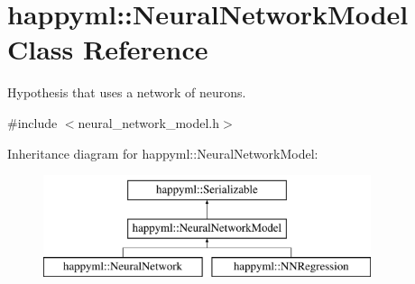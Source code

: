 \hypertarget{classhappyml_1_1NeuralNetworkModel}{}\section{happyml\+:\+:Neural\+Network\+Model Class Reference}
\label{classhappyml_1_1NeuralNetworkModel}


Hypothesis that uses a network of neurons.  




{\ttfamily \#include $<$neural\+\_\+network\+\_\+model.\+h$>$}

Inheritance diagram for happyml\+:\+:Neural\+Network\+Model\+:\begin{figure}[H]
\begin{center}
\leavevmode
\includegraphics[height=3.000000cm]{classhappyml_1_1NeuralNetworkModel}
\end{center}
\end{figure}
